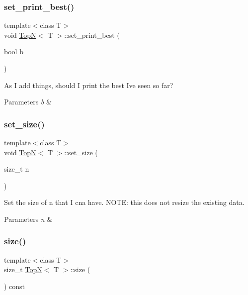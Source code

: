 \subsubsection{\texorpdfstring{set\+\_\+print\+\_\+best()}{set\_print\_best()}}
{\footnotesize\ttfamily template$<$class T$>$ \\
void \hyperlink{class_top_n}{TopN}$<$ T $>$\+::set\+\_\+print\+\_\+best (\begin{DoxyParamCaption}\item[{bool}]{b }\end{DoxyParamCaption})\hspace{0.3cm}{\ttfamily [inline]}}

As I add things, should I print the best I\textquotesingle{}ve seen so far? 
\begin{DoxyParams}{Parameters}
{\em b} & \\
\hline
\end{DoxyParams}
\mbox{\label{class_top_n_a37c7506de12038af705c55fc479dba7b}} 
\subsubsection{\texorpdfstring{set\+\_\+size()}{set\_size()}}
{\footnotesize\ttfamily template$<$class T$>$ \\
void \hyperlink{class_top_n}{TopN}$<$ T $>$\+::set\+\_\+size (\begin{DoxyParamCaption}\item[{size\+\_\+t}]{n }\end{DoxyParamCaption})\hspace{0.3cm}{\ttfamily [inline]}}

Set the size of n that I cna have. N\+O\+TE\+: this does not resize the existing data. 
\begin{DoxyParams}{Parameters}
{\em n} & \\
\hline
\end{DoxyParams}
\mbox{\label{class_top_n_ae32d3e10d1571af34f84f32f5ca78fff}} 
\subsubsection{\texorpdfstring{size()}{size()}}
{\footnotesize\ttfamily template$<$class T$>$ \\
size\+\_\+t \hyperlink{class_top_n}{TopN}$<$ T $>$\+::size (\begin{DoxyParamCaption}{ }\end{DoxyParamCaption}) const\hspace{0.3cm}{\ttfamily [inline]}}

